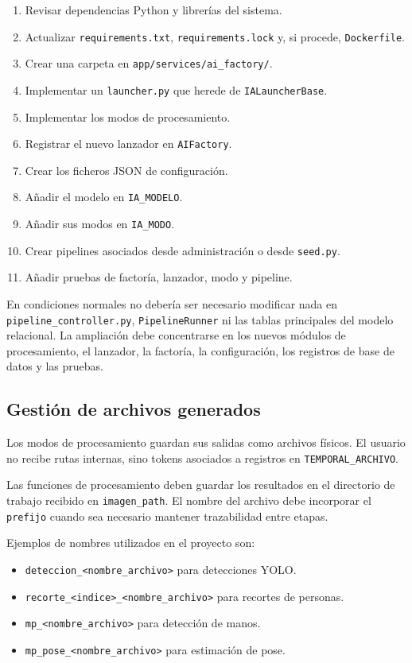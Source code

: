\begin{enumerate}
	\item Revisar dependencias Python y librerías del sistema.
	\item Actualizar \texttt{requirements.txt}, \texttt{requirements.lock} y, si procede, \texttt{Dockerfile}.
	\item Crear una carpeta en \texttt{app/services/ai\_factory/}.
	\item Implementar un \texttt{launcher.py} que herede de \texttt{IALauncherBase}.
	\item Implementar los modos de procesamiento.
	\item Registrar el nuevo lanzador en \texttt{AIFactory}.
	\item Crear los ficheros JSON de configuración.
	\item Añadir el modelo en \texttt{IA\_MODELO}.
	\item Añadir sus modos en \texttt{IA\_MODO}.
	\item Crear pipelines asociados desde administración o desde \texttt{seed.py}.
	\item Añadir pruebas de factoría, lanzador, modo y pipeline.
\end{enumerate}

En condiciones normales no debería ser necesario modificar nada en \texttt{pipeline\_controller.py}, \texttt{PipelineRunner} ni las tablas principales del modelo relacional. La ampliación debe concentrarse en los nuevos módulos de procesamiento, el lanzador, la factoría, la configuración, los registros de base de datos y las pruebas.

\subsection{Gestión de archivos generados}

Los modos de procesamiento guardan sus salidas como archivos físicos. El usuario no recibe rutas internas, sino tokens asociados a registros en \texttt{TEMPORAL\_ARCHIVO}.

Las funciones de procesamiento deben guardar los resultados en el directorio de trabajo recibido en \texttt{imagen\_path}. El nombre del archivo debe incorporar el \texttt{prefijo} cuando sea necesario mantener trazabilidad entre etapas.

Ejemplos de nombres utilizados en el proyecto son:

\begin{itemize}
	\item \texttt{deteccion\_<nombre\_archivo>} para detecciones YOLO.
	\item \texttt{recorte\_<indice>\_<nombre\_archivo>} para recortes de personas.
	\item \texttt{mp\_<nombre\_archivo>} para detección de manos.
	\item \texttt{mp\_pose\_<nombre\_archivo>} para estimación de pose.
\end{itemize}

